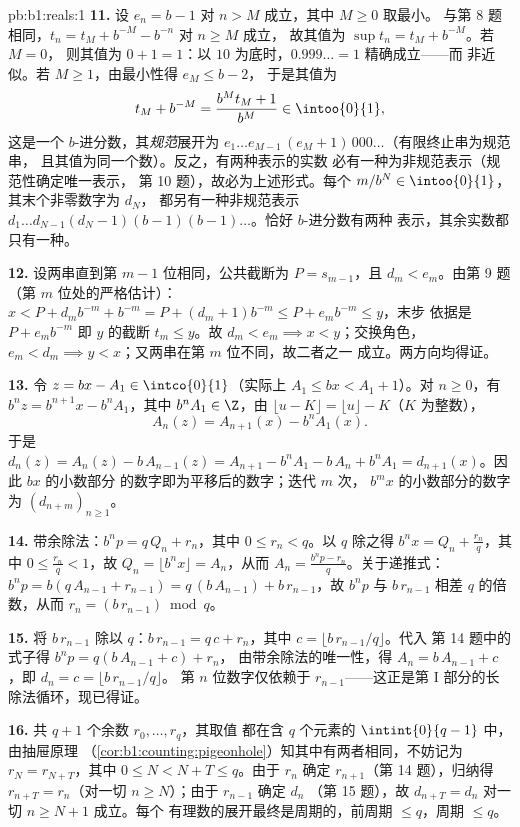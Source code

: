 \begin{solution}{pb:b1:reals:1}
\textbf{11.} 设 $e_n = b - 1$ 对 $n > M$ 成立，其中 $M \geq 0$ 取最小。
与第 8 题相同，$t_n = t_M + b^{-M} - b^{-n}$ 对 $n \geq M$ 成立，
故其值为 $\sup t_n = t_M + b^{-M}$。若 $M = 0$，
则其值为 $0 + 1 = 1$：以 $10$ 为底时，$0.999\dots = 1$ 精确成立——而
非近似。若 $M \geq 1$，由最小性得 $e_M \leq b - 2$，
于是其值为
\[
t_M + b^{-M} = \frac{b^M t_M + 1}{b^M} \in \intoo{0}{1},
\]
这是一个 $b$-进分数，其\emph{规范}展开为 $e_1 \dots
e_{M-1}\,(e_M + 1)\,000\dots$（有限终止串为规范串，
且其值为同一个数）。反之，有两种表示的实数
必有一种为非规范表示（规范性确定唯一表示，
第 10 题），故必为上述形式。每个
$m/b^N \in \intoo{0}{1}$，其末个非零数字为 $d_N$，
都另有一种非规范表示 $d_1 \dots d_{N-1}(d_N -
1)(b-1)(b-1)\dots$。恰好 $b$-进分数有两种
表示，其余实数都只有一种。

\textbf{12.} 设两串直到第 $m - 1$ 位相同，公共截断为
$P = s_{m-1}$，且 $d_m < e_m$。由第 9 题
（第 $m$ 位处的严格估计）：$x < P + d_m b^{-m} + b^{-m} = P +
(d_m + 1)b^{-m} \leq P + e_m b^{-m} \leq y$，末步
依据是 $P + e_m b^{-m}$ 即 $y$ 的截断 $t_m \leq y$。故
$d_m < e_m \implies x < y$；交换角色，$e_m < d_m \implies
y < x$；又两串在第 $m$ 位不同，故二者之一
成立。两方向均得证。

\textbf{13.} 令 $z = bx - A_1 \in \intco{0}{1}$（实际上 $A_1
\leq bx < A_1 + 1$）。对 $n \geq 0$，有 $b^n z = b^{n+1} x - b^n
A_1$，其中 $b^n A_1 \in \Z$，由 $\lfloor u - K \rfloor =
\lfloor u \rfloor - K$（$K$ 为整数），
\[
A_n(z) = A_{n+1}(x) - b^n A_1(x) .
\]
于是 $d_n(z) = A_n(z) - b\,A_{n-1}(z) = A_{n+1} - b^n A_1 -
b\,A_n + b^n A_1 = d_{n+1}(x)$。因此 $bx$ 的小数部分
的数字即为平移后的数字；迭代 $m$ 次，
$b^m x$ 的小数部分的数字为 $(d_{n+m})_{n \geq 1}$。

\textbf{14.} 带余除法：$b^n p = q\,Q_n + r_n$，其中 $0
\leq r_n < q$。以 $q$ 除之得 $b^n x = Q_n + \frac{r_n}{q}$，其中
$0 \leq \frac{r_n}{q} < 1$，故 $Q_n = \lfloor b^n x \rfloor =
A_n$，从而 $A_n = \frac{b^n p - r_n}{q}$。关于递推式：
$b^n p = b(q\,A_{n-1} + r_{n-1}) = q\,(b\,A_{n-1}) +
b\,r_{n-1}$，故 $b^n p$ 与 $b\,r_{n-1}$ 相差
$q$ 的倍数，从而 $r_n = (b\,r_{n-1}) \bmod q$。

\textbf{15.} 将 $b\,r_{n-1}$ 除以 $q$：$b\,r_{n-1} = q\,c +
r_n$，其中 $c = \lfloor b\,r_{n-1}/q \rfloor$。代入
第 14 题中的式子得 $b^n p = q(b\,A_{n-1} + c) + r_n$，
由带余除法的唯一性，得 $A_n = b\,A_{n-1}
+ c$，即 $d_n = c = \lfloor b\,r_{n-1}/q \rfloor$。
第 $n$ 位数字仅依赖于 $r_{n-1}$——这正是第
I 部分的长除法循环，现已得证。

\textbf{16.} 共 $q + 1$ 个余数 $r_0, \dots, r_q$，其取值
都在含 $q$ 个元素的 $\intint{0}{q-1}$ 中，由抽屉原理
（\cref{cor:b1:counting:pigeonhole}）知其中有两者相同，不妨记为
$r_N = r_{N+T}$，其中 $0 \leq N < N + T \leq q$。由于 $r_n$
确定 $r_{n+1}$（第 14 题），归纳得 $r_{n+T} =
r_n$（对一切 $n \geq N$）；由于 $r_{n-1}$ 确定 $d_n$
（第 15 题），故 $d_{n+T} = d_n$ 对一切 $n \geq N + 1$ 成立。每个
有理数的展开最终是周期的，前周期 $\leq
q$，周期 $\leq q$。


\end{solution}
